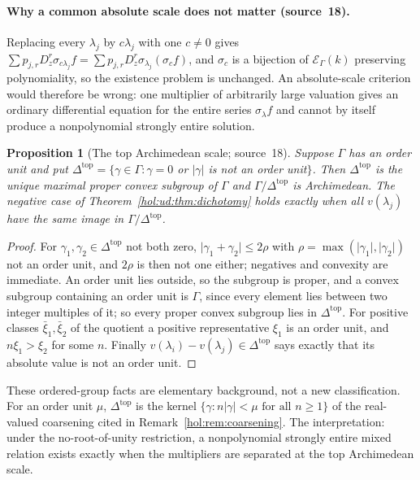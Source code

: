 \documentclass[11pt]{article}
\numberwithin{equation}{section}
\newtheorem{proposition}[theorem]{Proposition}
\theoremstyle{definition}
\theoremstyle{remark}
\newcommand{\abs}[1]{\lvert#1\rvert}
\newcommand{\EK}{\mathcal E_\Gamma(k)}
\begin{document}
\paragraph{Why a common absolute scale does not matter (source~18).}
Replacing every $\lambda_j$ by $c\lambda_j$ with one $c\ne0$ gives
$\sum p_{j,r}D_z^r\sigma_{c\lambda_j}f=\sum p_{j,r}D_z^r\sigma_{\lambda_j}
(\sigma_cf)$, and $\sigma_c$ is a bijection of $\EK$ preserving polynomiality,
so the existence problem is unchanged. An absolute-scale criterion would
therefore be wrong: one multiplier of arbitrarily large valuation gives an
ordinary differential equation for the entire series $\sigma_\lambda f$ and
cannot by itself produce a nonpolynomial strongly entire solution.

\begin{proposition}[The top Archimedean scale; source~18]
\label{hol:ud:prop:top}
Suppose $\Gamma$ has an order unit and put
$\Delta^{\mathrm{top}}=\{\gamma\in\Gamma:\gamma=0$ or $\abs\gamma$ is not an
order unit$\}$. Then $\Delta^{\mathrm{top}}$ is the unique maximal proper
convex subgroup of $\Gamma$ and $\Gamma/\Delta^{\mathrm{top}}$ is Archimedean.
The negative case of Theorem~\ref{hol:ud:thm:dichotomy} holds exactly when all
$v(\lambda_j)$ have the same image in $\Gamma/\Delta^{\mathrm{top}}$.
\end{proposition}

\begin{proof}
For $\gamma_1,\gamma_2\in\Delta^{\mathrm{top}}$ not both zero,
$\abs{\gamma_1+\gamma_2}\le2\rho$ with $\rho=\max(\abs{\gamma_1},\abs{\gamma_2})$
not an order unit, and $2\rho$ is then not one either; negatives and convexity are immediate. An order unit lies
outside, so the subgroup is proper, and a convex subgroup containing an order
unit is $\Gamma$, since every element lies between two integer multiples of
it; so every proper convex subgroup lies in $\Delta^{\mathrm{top}}$. For
positive classes $\bar\xi_1,\bar\xi_2$ of the quotient a positive
representative $\xi_1$ is an order unit, and $n\xi_1>\xi_2$ for some $n$. Finally
$v(\lambda_i)-v(\lambda_j)\in\Delta^{\mathrm{top}}$ says exactly that its
absolute value is not an order unit.
\end{proof}

These ordered-group facts are elementary background, not a new
classification. For an order unit $\mu$, $\Delta^{\mathrm{top}}$ is the kernel
$\{\gamma:n\abs\gamma<\mu\text{ for all }n\ge1\}$ of the real-valued
coarsening cited in Remark~\ref{hol:rem:coarsening}. The interpretation:
under the no-root-of-unity restriction, a nonpolynomial strongly entire mixed
relation exists exactly when the multipliers are separated at the top
Archimedean scale.
\end{document}

